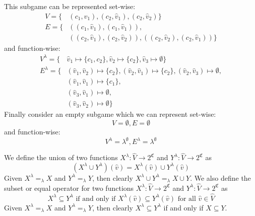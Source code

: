 \begin{example}
\begin{center}
	\end{center}
	This subgame can be represented set-wise:
	\begin{align*}
	V = \{&(c_1,\hat{v}_1),(c_2,\hat{v}_1),(c_2,\hat{v}_2) \}\\
	E = \{& ((c_1,\hat{v}_1),(c_1,\hat{v}_1)), \\
	&((c_2,\hat{v}_1),(c_2,\hat{v}_2)),((c_2,\hat{v}_2),(c_2,\hat{v}_1)) \}
	\end{align*}
	and function-wise:
	\begin{align*}
	V^\lambda = \{&\hat{v}_1 \mapsto \{c_1,c_2\},\hat{v}_2 \mapsto \{c_2\},\hat{v}_3 \mapsto \emptyset\}\\
	E^\lambda = \{&(\hat{v}_1,\hat{v}_2) \mapsto \{c_2\},(\hat{v}_2,\hat{v}_1) \mapsto \{c_2\},(\hat{v}_2,\hat{v}_3) \mapsto \emptyset,\\
	&(\hat{v}_1,\hat{v}_1) \mapsto \{c_1\},\\
	&(\hat{v}_3,\hat{v}_1) \mapsto \emptyset,\\
	&(\hat{v}_3,\hat{v}_2) \mapsto \emptyset\}
	\end{align*}
	Finally consider an empty subgame which we can represent set-wise:
	\[ V = \emptyset, E = \emptyset \]
	and function-wise:
	\[ V^\lambda = \lambda^\emptyset, E^\lambda = \lambda^\emptyset \]
\end{example}

We define the union of two functions $X^\lambda : \hat{V} \rightarrow 2^\mathfrak{C}$ and $Y^\lambda : \hat{V} \rightarrow 2^\mathfrak{C}$ as
\[ (X^\lambda \cup Y^\lambda)(\hat{v}) = X^\lambda(\hat{v}) \cup Y^\lambda(\hat{v})\]
Given $X^\lambda =_\lambda X$ and $Y^\lambda =_\lambda Y$, then clearly $X^\lambda \cup Y^\lambda =_\lambda X \cup Y$. We also define the subset or equal operator for two functions $X^\lambda : \hat{V} \rightarrow 2^\mathfrak{C}$ and $Y^\lambda : \hat{V} \rightarrow 2^\mathfrak{C}$ as
\[ X^\lambda \subseteq Y^\lambda\text{ if and only if } X^\lambda(\hat{v}) \subseteq Y^\lambda(\hat{v})\text{ for all }\hat{v} \in \hat{V} \]
Given $X^\lambda =_\lambda X$ and $Y^\lambda =_\lambda Y$, then clearly $X^\lambda \subseteq Y^\lambda$ if and only if $X \subseteq Y$.

